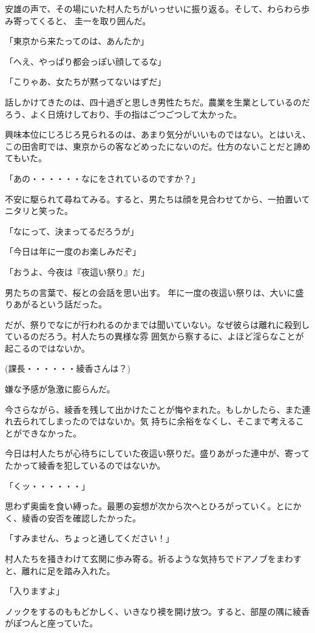 ﻿\documentclass[book,tate]{jlreq}
\begin{document}
安雄の声で、その場にいた村人たちがいっせいに振り返る。そして、わらわら歩み寄ってくると、 圭一を取り囲んだ。

「東京から来たってのは、あんたか」

「へえ、やっぱり都会っぽい顔してるな」

「こりゃあ、女たちが黙ってないはずだ」

話しかけてきたのは、四十過ぎと思しき男性たちだ。農業を生業としているのだろう、よく日焼けしており、手の指はごつごつして太かった。

興味本位にじろじろ見られるのは、あまり気分がいいものではない。とはいえ、この田舎町では、東京からの客などめったにないのだ。仕方のないことだと諦めてもいた。

「あの・・・・・・なにをされているのですか？」

不安に駆られて尋ねてみる。すると、男たちは顔を見合わせてから、一拍置いてニタリと笑った。

「なにって、決まってるだろうが」

「今日は年に一度のお楽しみだぞ」

「おうよ、今夜は『夜這い祭り』だ」

男たちの言葉で、桜との会話を思い出す。 年に一度の夜這い祭りは、大いに盛りあがるという話だった。

だが、祭りでなにが行われるのかまでは聞いていない。なぜ彼らは離れに殺到しているのだろう。村人たちの異様な雰 囲気から察するに、よほど淫らなことが起こるのではないか。

(課長・・・・・・綾香さんは？)

嫌な予感が急激に膨らんだ。

今さらながら、綾香を残して出かけたことが悔やまれた。もしかしたら、また連れ去られてしまったのではないか。気 持ちに余裕をなくし、そこまで考えることができなかった。

今日は村人たちが心待ちにしていた夜這い祭りだ。盛りあがった連中が、寄ってたかって綾香を犯しているのではないか。

「くッ・・・・・・」

思わず奥歯を食い縛った。最悪の妄想が次から次へとひろがっていく。とにかく、綾香の安否を確認したかった。

「すみません、ちょっと通してください！」

村人たちを掻きわけて玄関に歩み寄る。祈るような気持ちでドアノブをまわすと、離れに足を踏み入れた。

「入りますよ」

ノックをするのももどかしく、いきなり襖を開け放つ。すると、部屋の隅に綾香がぽつんと座っていた。
\end{document}
